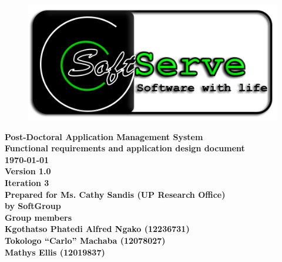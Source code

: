 \documentclass[12pt]{article}
\newcommand{\Title}{Functional requirements and application design document} %
\newcommand{\ssr}{Soft\color{green}{Serve }\color{black}}
\newcommand{\version}{1.0}
\newcommand{\iteration}{3}
\newcommand{\client}{Ms. Cathy Sandis (UP Research Office)}
\newcommand{\project}{Post-Doctoral Application Management System}
\begin{document}
\vspace{4em}

\begin{center}%

\begin{figure}[ht!]
\centering
\includegraphics{../Images_Docs/logo.png}
\end{figure}
\LARGE \bf \project \\[1em]
\LARGE \bf \Title \\[0.25em]
\large \bf \today\\
\bf Version \version\\
\bf Iteration \iteration\\[0.5em]
\Large \bf Prepared for \client\\
\Large \bf by
\Large {\bf \ssr Group }\\[0.5em]
\LARGE {\bf Group members}\\[0.25em]
\large
Kgothatso Phatedi Alfred Ngako (12236731) \\[0.5em]
Tokologo “Carlo” Machaba (12078027) \\[0.5em]
Mathys Ellis (12019837) \\[8em]

\end{center}%

\end{document}
